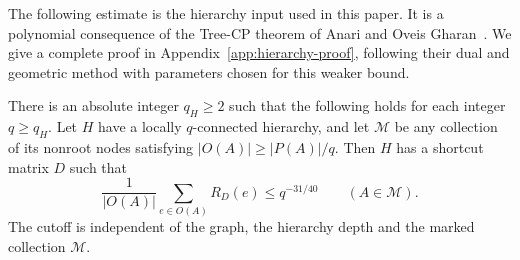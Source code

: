 The following estimate is the hierarchy input used in this paper.
It is a polynomial consequence of the Tree-CP theorem of Anari and
Oveis Gharan~\cite[Theorem~3.5, printed p.~22]{AOG}.  We give a complete
proof in Appendix~\ref{app:hierarchy-proof}, following their dual and
geometric method with parameters chosen for this weaker bound.

\begin{theorem}\label{thm:hierarchy-power}
There is an absolute integer $q_H\ge2$ such that the following holds for
each integer $q\ge q_H$.  Let $H$ have a locally $q$-connected hierarchy,
and let $\mathcal M$ be any collection of its nonroot nodes satisfying
$|O(A)|\ge |P(A)|/q$.  Then $H$ has a shortcut matrix $D$ such that
\begin{equation}\label{eq:hierarchy-power}
 \frac{1}{|O(A)|}\sum_{e\in O(A)}R_D(e)\le q^{-31/40}
 \qquad(A\in\mathcal M).
\end{equation}
The cutoff is independent of the graph, the hierarchy depth and the
marked collection $\mathcal M$.
\end{theorem}
